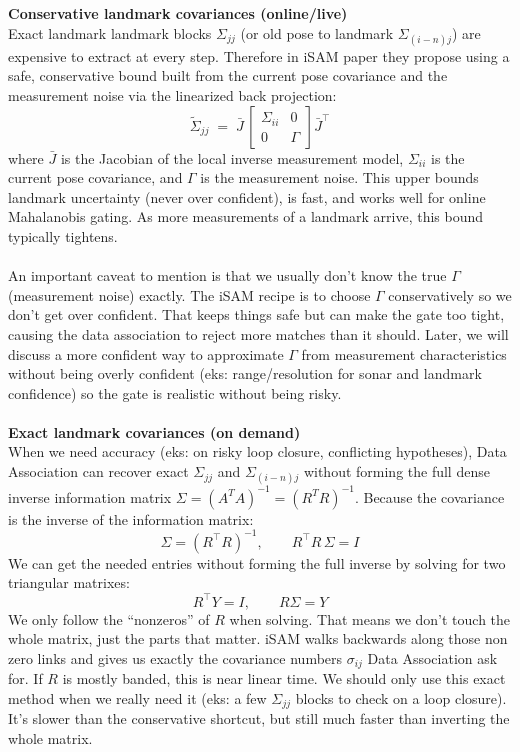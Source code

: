 \noindent
\textbf{Conservative landmark covariances (online/live)} 
\\ \noindent
Exact landmark landmark blocks $\Sigma_{jj}$ (or old pose to landmark $\Sigma_{(i-n)j}$) are expensive to extract at every step. Therefore in \gls{iSAM} paper \cite{iSAM_paper} they propose using a safe, conservative bound built from the current pose covariance and the measurement noise via the linearized back projection:
$$
    \tilde\Sigma_{jj}
    \;=\;
    \bar J\,
    \begin{bmatrix}
    \Sigma_{ii} & 0\\[2pt]
    0 & \Gamma
    \end{bmatrix}
    \bar J^\top
$$
where $\bar J$ is the Jacobian of the local inverse measurement model, $\Sigma_{ii}$ is the current pose covariance, and $\Gamma$ is the measurement noise. This upper bounds landmark uncertainty (never over confident), is fast, and works well for online Mahalanobis gating. As more measurements of a landmark arrive, this bound typically tightens.
\\ \\
An important caveat to mention is that we usually don't know the true $\Gamma$ (measurement noise) exactly. The \gls{iSAM} recipe is to choose $\Gamma$ conservatively so we don't get over confident. That keeps things safe but can make the gate too tight, causing the data association to reject more matches than it should. Later, we will discuss a more confident way to approximate $\Gamma$ from measurement characteristics without being overly confident (eks: range/resolution for sonar and landmark confidence) so the gate is realistic without being risky.
\\ \\
\textbf{Exact landmark covariances (on demand)} 
\\ \noindent
When we need accuracy (eks: on risky loop closure, conflicting hypotheses), Data Association can recover exact $\Sigma_{jj}$ and $\Sigma_{(i-n)j}$ without forming the full dense inverse information matrix $\Sigma=(A^{T}A)^{-1}=(R^{T}R)^{-1}$. Because the covariance is the inverse of the information matrix:
$$
    \Sigma=(R^\top R)^{-1}, \qquad R^\top R\,\Sigma = I
$$
We can get the needed entries without forming the full inverse by solving for two triangular matrixes:
$$
R^\top Y = I, \qquad R \Sigma = Y
$$
We only follow the ``nonzeros'' of $R$ when solving. That means we don't touch the whole matrix, just the parts that matter. \gls{iSAM} walks backwards along those non zero links and gives us exactly the covariance numbers $\sigma_{ij}$ Data Association ask for. If $R$ is mostly banded, this is near linear time. We should only use this exact method when we really need it (eks: a few $\Sigma_{jj}$ blocks to check on a loop closure). It's slower than the conservative shortcut, but still much faster than inverting the whole matrix.
